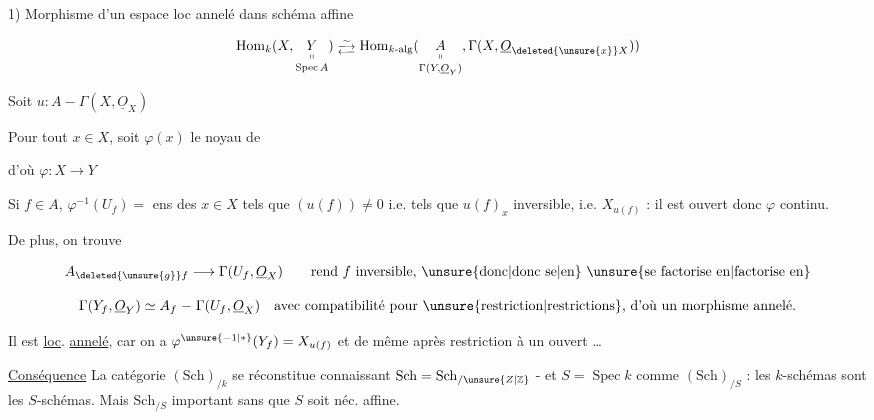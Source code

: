 1) Morphisme d'un espace loc annelé dans schéma affine

\[
 \operatorname{Hom}_k(X,\underset{\operatorname{Spec} A}{\underset{\shortparallel}{Y}})
 \mathrel{\substack{\overset{\sim}{\longrightarrow}\\[-2pt]\longleftarrow}}
 \operatorname{Hom}_{k\text{-alg}}(\underset{\Gamma(Y,\underline O_Y)}{\underset{\shortparallel}{A}},\Gamma(X,\underline O_{\deleted{\unsure{x}}X}))
\]

 Soit $u:A\mathrel{-}\Gamma(X,\underline O_X)$

Pour tout $x\in X$, soit $\varphi(x)$  le noyau de


d'où $\varphi:X\longrightarrow Y$

Si $f\in A$, $\varphi^{-1}(U_f)={}$ ens des $x\in X$ tels que $(u(f))\ne 0$ i.e. tels que $u(f)_x$ inversible, i.e. $X_{u(f)}$ : il est ouvert donc $\varphi$ continu.

De plus, on trouve

\[ A_{\deleted{\unsure{g}}f}\longrightarrow\Gamma(U_f,\underline O_X)\qquad\text{rend $f$ inversible, \unsure{donc|donc se|en} \unsure{se factorise en|factorise en}} \]

\[ \Gamma(Y_f,\underline O_Y)\simeq A_f\mathrel{-}\Gamma(U_f,\underline O_X)\quad\text{avec compatibilité pour \unsure{restriction|restrictions}, d'où un morphisme annelé.} \]

Il est \uline{loc}. \uline{annelé}, car   on a $\varphi^{\unsure{-1|*}}(Y_f)=X_{u(f)}$ et de même après restriction à un ouvert \ldots

\uline{Conséquence} La catégorie $(\mathrm{Sch})_{/k}$ se réconstitue connaissant $\mathrm{Sch}=\mathrm{Sch}_{/\unsure{Z|\mathbb Z}}$ - et $S=\operatorname{Spec} k$ comme $(\mathrm{Sch})_{/S}$ : les $k$-schémas sont les $S$-schémas. Mais $\mathrm{Sch}_{/S}$ important sans que $S$ soit néc. affine.


